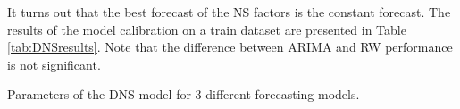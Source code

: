             It turns out that the best forecast of the NS factors is the constant forecast. The results of the model calibration on a train dataset are presented in Table \ref{tab:DNSresults}. Note that the difference between ARIMA and RW performance is not significant.
            \begin{table}[htbp]
                \centering
                
                \caption{Parameters of the DNS model for 3 different forecasting models.}
                \label{tab:DNSresults}
            \end{table}
